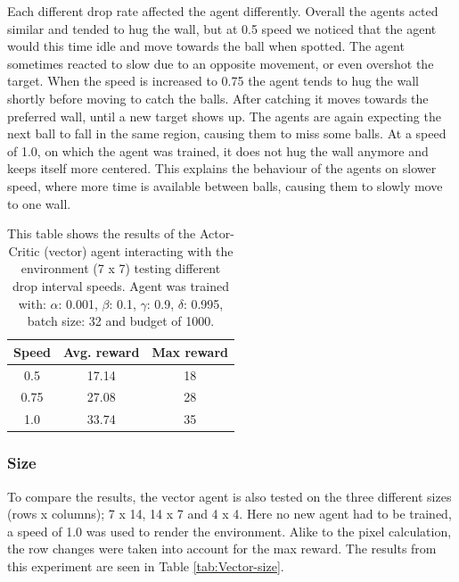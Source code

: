 \documentclass{article}
\begin{document}
Each different drop rate affected the agent differently. 
Overall the agents acted similar and tended to hug the wall, but at 0.5 speed we noticed that the agent would this time idle and move towards the ball when spotted.
The agent sometimes reacted to slow due to an opposite movement, or even overshot the target. 
When the speed is increased to 0.75 the agent tends to hug the wall shortly before moving to catch the balls.
After catching it moves towards the preferred wall, until a new target shows up.
The agents are again expecting the next ball to fall in the same region, causing them to miss some balls.
At a speed of 1.0, on which the agent was trained, it does not hug the wall anymore and keeps itself more centered.
This explains the behaviour of the agents on slower speed, where more time is available between balls, causing them to slowly move to one wall. 

\begin{table}[]
    \centering
    \begin{tabular}{|c|c|c|}
        \hline
        \textbf{Speed} & \textbf{Avg. reward} & \textbf{Max reward} \\
        \hline
        0.5   & 17.14       & 18                  \\
        0.75   & 27.08       & 28                  \\
        1.0   & 33.74        & 35                 \\
        \hline
    \end{tabular}
    \caption{This table shows the results of the Actor-Critic (vector) agent interacting with the environment (7 x 7) testing different drop interval speeds. Agent was trained with: $\alpha$: 0.001, $\beta$: 0.1, $\gamma$: 0.9, $\delta$: 0.995, batch size: 32 and budget of 1000. }
    \label{tab:Vector-speed}
\end{table}

\subsubsection{Size}
To compare the results, the vector agent is also tested on the three different sizes (rows x columns); 7 x 14, 14 x 7 and 4 x 4. 
Here no new agent had to be trained, a speed of 1.0 was used to render the environment. 
Alike to the pixel calculation, the row changes were taken into account for the max reward. 
The results from this experiment are seen in Table \ref{tab:Vector-size}.
\end{document}
